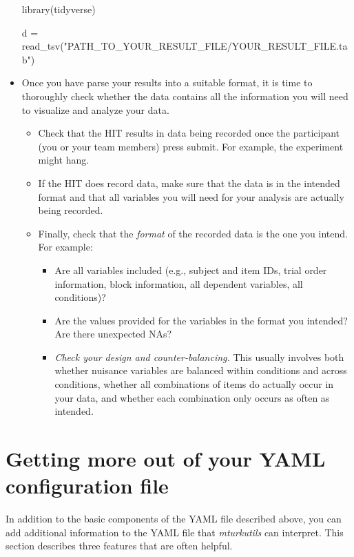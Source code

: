 \documentclass{article}
\newenvironment{code}%
   {\par\noindent\adjustbox{margin=1ex,bgcolor=shadecolor,margin=0ex \medskipamount}\bgroup\minipage\linewidth\verbatim}%
   {\endverbatim\endminipage\egroup}
\begin{document}
\begin{itemize}
\begin{code}
library(tidyverse)

d = read_tsv("PATH_TO_YOUR_RESULT_FILE/YOUR_RESULT_FILE.tab")
\end{code}
  
  \item Once you have parse your results into a suitable format, it is time to thoroughly check whether the data contains all the information you will need to visualize and analyze your data.
  
\begin{tcolorbox}[colback=gray!5,colframe=blue!40!black,title=Sandbox checklist---after obtaining results from sandbox]
  \begin{itemize}
    \item Check that the HIT results in data being recorded once the participant (you or your team members) press submit. For example, the experiment might hang.
    \item If the HIT does record data, make sure that the data is in the intended format and that all variables you will need for your analysis are actually being recorded.
    \item Finally, check that the {\em format} of the recorded data is the one you intend. For example:
    \begin{itemize}
      \item Are all variables included (e.g., subject and item IDs, trial order information, block information, all dependent variables, all conditions)?
      \item Are the values provided for the variables in the format you intended? Are there unexpected NAs?
      \item {\em Check your design and counter-balancing.} This usually involves both whether nuisance variables are balanced within conditions and across conditions, whether all combinations of items do actually occur in your data, and whether each combination only occurs as often as intended.
    \end{itemize}
  \end{itemize}
\end{tcolorbox}

\end{itemize}





\section{Getting more out of your YAML configuration file}
In addition to the basic components of the YAML file described above, you can add additional information to the YAML file that {\em mturkutils} can interpret. This section describes three features that are often helpful.
\end{document}

